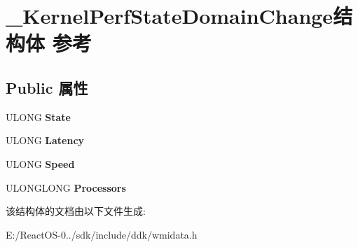 \hypertarget{struct___kernel_perf_state_domain_change}{}\section{\+\_\+\+Kernel\+Perf\+State\+Domain\+Change结构体 参考}
\label{struct___kernel_perf_state_domain_change}
\subsection*{Public 属性}
\begin{DoxyCompactItemize}
\item 
\mbox{\label{struct___kernel_perf_state_domain_change_ab9e975ba946021737ef6e88a5538ebe9}} 
U\+L\+O\+NG {\bfseries State}
\item 
\mbox{\label{struct___kernel_perf_state_domain_change_a906d1456b17aaf87b73b8671f2c296bf}} 
U\+L\+O\+NG {\bfseries Latency}
\item 
\mbox{\label{struct___kernel_perf_state_domain_change_a2c8028525e8761644ac108c7fcb18691}} 
U\+L\+O\+NG {\bfseries Speed}
\item 
\mbox{\label{struct___kernel_perf_state_domain_change_aa8d6f07fbd3c9a8102ac382cc4083e34}} 
U\+L\+O\+N\+G\+L\+O\+NG {\bfseries Processors}
\end{DoxyCompactItemize}


该结构体的文档由以下文件生成\+:\begin{DoxyCompactItemize}
\item 
E\+:/\+React\+O\+S-\/0../sdk/include/ddk/wmidata.\+h\end{DoxyCompactItemize}
